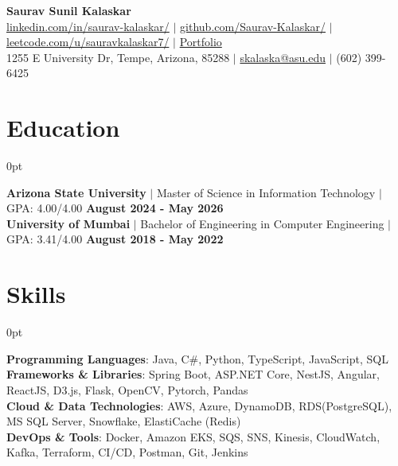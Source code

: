 \documentclass[letterpaper,10pt]{article}
\newlength{\contentindent}
\newcommand{\sectioncontent}[1]{%
  \begin{adjustwidth}{\contentindent}{0pt}%
  #1%
  \end{adjustwidth}%
}
\begin{document}
\setlength{\parindent}{0pt}
\setlength{\parskip}{0pt}
\setlength{\rightskip}{0.25em}

\begin{center}
    {\Huge \textbf{Saurav Sunil Kalaskar}}\\[2pt]
    
    \href{http://www.linkedin.com/in/saurav-kalaskar}{linkedin.com/in/saurav-kalaskar/} $|$
    \href{https://github.com/Saurav-Kalaskar}{github.com/Saurav-Kalaskar/} $|$
    \href{https://leetcode.com/u/sauravkalaskar7/}{leetcode.com/u/sauravkalaskar7/} $|$
    \href{https://www.saurav-kalaskar.me/}{Portfolio}
    \\
    1255 E University Dr, Tempe, Arizona, 85288 $|$ \href{mailto:skalaska@asu.edu}{skalaska@asu.edu} $|$ (602) 399-6425    
\end{center}

\section{Education}
\sectioncontent{
\textbf{Arizona State University} $|$ Master of Science in Information Technology $|$ GPA: 4.00/4.00 \hfill \textbf{August 2024 - May 2026}
\\[2pt]
\textbf{University of Mumbai} $|$ Bachelor of Engineering in Computer Engineering $|$ GPA: 3.41/4.00 \hfill \textbf{August 2018 - May 2022}
\\[2pt]
}

\section{Skills}
\sectioncontent{
\textbf{Programming Languages}: Java, C\#, Python, TypeScript, JavaScript, SQL\\
\textbf{Frameworks \& Libraries}: Spring Boot, ASP.NET Core, NestJS, Angular, ReactJS, D3.js, Flask, OpenCV, Pytorch, Pandas\\
\textbf{Cloud \& Data Technologies}: AWS, Azure, DynamoDB, RDS(PostgreSQL), MS SQL Server, Snowflake, ElastiCache (Redis)\\
\textbf{DevOps \& Tools}: Docker, Amazon EKS, SQS, SNS, Kinesis, CloudWatch, Kafka, Terraform, CI/CD, Postman, Git, Jenkins\\
}
\end{document}
